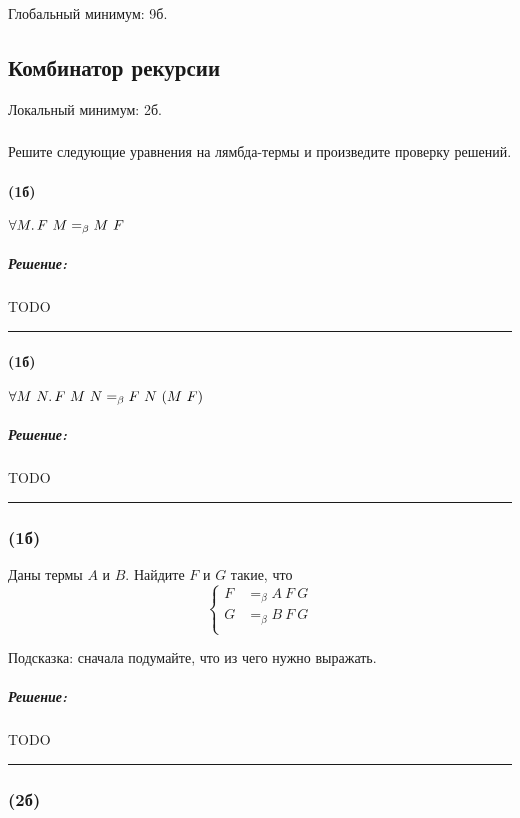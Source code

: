 \documentclass{article}
\newenvironment{proof}{\subparagraph{\hspace{-1em}Решение:\newline}}{\par\noindent\rule{\textwidth}{0.4pt}}
\newcommand{\eqbeta}{=_\beta}
\begin{document}
    Глобальный минимум: 9б.

    \subsection{Комбинатор рекурсии}

    Локальный минимум: 2б.

    \subsubsection{}

    Решите следующие уравнения на лямбда-термы и произведите проверку решений.

    \paragraph{(1б)}

    $\forall M\ldotp F~M \eqbeta M~F$

    \begin{proof}
        TODO %
    \end{proof}

    \paragraph{(1б)}

    $\forall M~N\ldotp F~M~N \eqbeta F~N~(M~F)$

    \begin{proof}
        TODO %
    \end{proof}

    \subsubsection{(1б)}

    Даны термы $A$ и $B$.
    Найдите $F$ и $G$ такие, что
    \[
        \left\{
        \begin{aligned}
            F &\eqbeta A~F~G \\
            G &\eqbeta B~F~G \\
        \end{aligned}\right.
    \]

    Подсказка: сначала подумайте, что из чего нужно выражать.

    \begin{proof}
        TODO %
    \end{proof}

    \subsubsection{(2б)}
\end{document}
